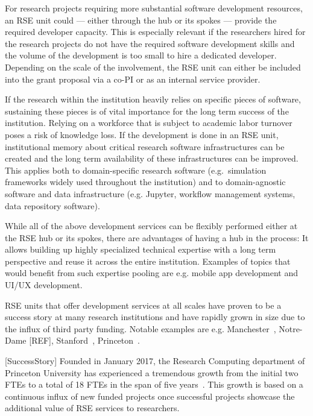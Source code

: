 \documentclass[a4paper]{article}
\makeatletter
\newcommand*{\eg}{e.g.\@\xspace}
\makeatother
\begin{document}
For research projects requiring more substantial software development resources, an RSE unit could --- either through the hub or its spokes --- provide the required developer capacity.
This is especially relevant if the researchers hired for the research projects do not have the required software development skills and the volume of the development is too small to hire a dedicated developer.
Depending on the scale of the involvement, the RSE unit can either be included into the grant proposal via a co-PI or as an internal service provider.

If the research within the institution heavily relies on specific pieces of software,
sustaining these pieces is of vital importance for the long term success of the institution.
Relying on a workforce that is subject to academic labor turnover poses a risk of knowledge loss.
If the development is done in an RSE unit, institutional memory about critical research software infrastructures can be created and the long term availability of these infrastructures can be improved.
This applies both to domain-specific research software (e.g.\ simulation frameworks widely used throughout the institution)
and to domain-agnostic software and data infrastructure (\eg{} Jupyter, workflow management systems, data repository software).

While all of the above development services can be flexibly performed either at the RSE hub or its spokes, there are advantages of having a hub in the process:
It allows building up highly specialized technical expertise with a long term perspective and reuse it across the entire institution.
Examples of topics that would benefit from such expertise pooling are \eg{} mobile app development and UI/UX development.

RSE units that offer development services at all scales have proven to be a success story at many research institutions and have rapidly grown in size due to the influx of third party funding.
Notable examples are \eg{} Manchester~\autocite{Sinclair2022}, Notre-Dame [REF], Stanford~\autocite{Stanford2023}, Princeton~\autocite{Cosden2022a}.

[SuccessStory]
Founded in January 2017, the Research Computing department of Princeton University has experienced a tremendous growth from the initial two FTEs to a total of 18 FTEs in the span of five years~\autocite{Cosden2022a}.
This growth is based on a continuous influx of new funded projects once successful projects showcase the additional value of RSE services to researchers.
\end{document}
